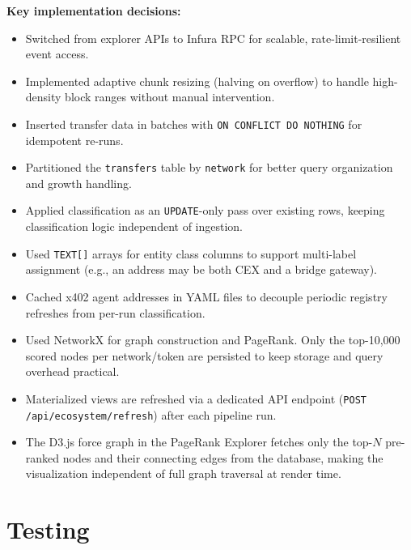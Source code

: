 \documentclass[a4paper,12pt]{report}
\begin{document}
\textbf{Key implementation decisions:}
\begin{itemize}
\item Switched from explorer APIs to Infura RPC for scalable, rate-limit-resilient event access.
\item Implemented adaptive chunk resizing (halving on overflow) to handle high-density block ranges
without manual intervention.
\item Inserted transfer data in batches with \texttt{ON CONFLICT DO NOTHING} for idempotent
re-runs.
\item Partitioned the \texttt{transfers} table by \texttt{network} for better query organization
and growth handling.
\item Applied classification as an \texttt{UPDATE}-only pass over existing rows, keeping
classification logic independent of ingestion.
\item Used \texttt{TEXT[]} arrays for entity class columns to support multi-label assignment
(e.g., an address may be both CEX and a bridge gateway).
\item Cached x402 agent addresses in YAML files to decouple periodic registry refreshes from
per-run classification.
\item Used NetworkX for graph construction and PageRank. Only the top-10,000 scored nodes per
network/token are persisted to keep storage and query overhead practical.
\item Materialized views are refreshed via a dedicated API endpoint
(\texttt{POST /api/ecosystem/refresh}) after each pipeline run.
\item The D3.js force graph in the PageRank Explorer fetches only the top-$N$ pre-ranked nodes
and their connecting edges from the database, making the visualization independent of full graph
traversal at render time.
\end{itemize}

\section{Testing}
\end{document}
